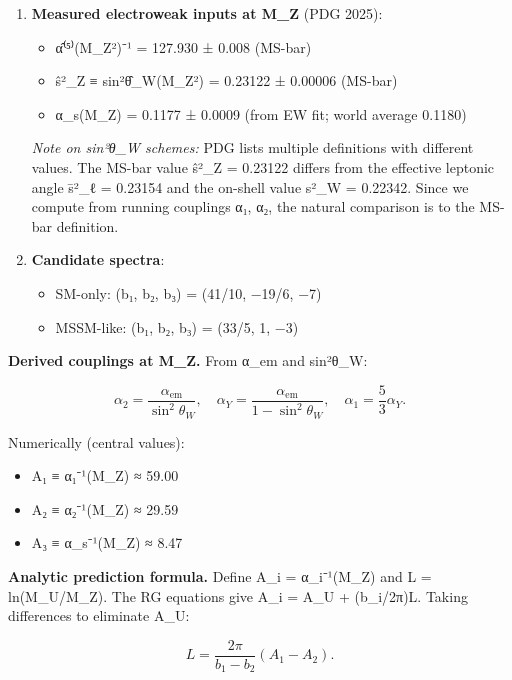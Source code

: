 \begin{enumerate}
\def\labelenumi{\arabic{enumi}.}
\setcounter{enumi}{2}
\item
  \textbf{Measured electroweak inputs at M\_Z} (PDG 2025):

  \begin{itemize}
  \tightlist
  \item
    \^{α}⁽⁵⁾(M\_Z²)⁻¹ = 127.930 ± 0.008 (MS-bar)
  \item
    \^{s}²\_Z ≡ sin²\^{θ}\_W(M\_Z²) = 0.23122 ± 0.00006 (MS-bar)
  \item
    α\_s(M\_Z) = 0.1177 ± 0.0009 (from EW fit; world average 0.1180)
  \end{itemize}

  \emph{Note on sin²θ\_W schemes:} PDG lists multiple definitions with different values. The MS-bar value \^{s}²\_Z = 0.23122 differs from the effective leptonic angle \={s}²\_ℓ = 0.23154 and the on-shell value s²\_W = 0.22342. Since we compute from running couplings α₁, α₂, the natural comparison is to the MS-bar definition.
\item
  \textbf{Candidate spectra}:

  \begin{itemize}
  \tightlist
  \item
    SM-only: (b₁, b₂, b₃) = (41/10, −19/6, −7)
  \item
    MSSM-like: (b₁, b₂, b₃) = (33/5, 1, −3)
  \end{itemize}
\end{enumerate}

\textbf{Derived couplings at M\_Z.} From α\_em and sin²θ\_W:

\[
\alpha_2 = \frac{\alpha_{\mathrm{em}}}{\sin^2\theta_W}, \quad
\alpha_Y = \frac{\alpha_{\mathrm{em}}}{1 - \sin^2\theta_W}, \quad
\alpha_1 = \frac{5}{3}\alpha_Y.
\]

Numerically (central values):

\begin{itemize}
\tightlist
\item
  A₁ ≡ α₁⁻¹(M\_Z) ≈ 59.00
\item
  A₂ ≡ α₂⁻¹(M\_Z) ≈ 29.59
\item
  A₃ ≡ α\_s⁻¹(M\_Z) ≈ 8.47
\end{itemize}

\textbf{Analytic prediction formula.} Define A\_i = α\_i⁻¹(M\_Z) and L = ln(M\_U/M\_Z). The RG equations give A\_i = A\_U + (b\_i/2π)L. Taking differences to eliminate A\_U:

\[
L = \frac{2\pi}{b_1 - b_2}(A_1 - A_2).
\]

